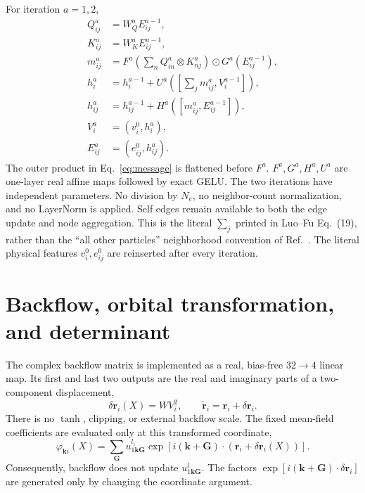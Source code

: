 For iteration $a=1,2$,
\begin{align}
 Q_{ij}^{a}&=W_Q^{a}E_{ij}^{a-1},\\
 K_{ij}^{a}&=W_K^{a}E_{ij}^{a-1},\\
 m_{ij}^{a}
 &=F^{a}\!\left(\sum_n
 Q_{in}^{a}\otimes K_{nj}^{a}\right)
 \odot G^{a}(E_{ij}^{a-1}),                             \label{eq:message}\\
 h_i^{a}
 &=h_i^{a-1}+U^{a}\!\left(
 [\sum_jm_{ij}^{a},V_i^{a-1}]\right),\\
 h_{ij}^{a}
 &=h_{ij}^{a-1}+H^{a}\!\left(
 [m_{ij}^{a},E_{ij}^{a-1}]\right),\\
 V_i^{a}&=(v_i^0,h_i^{a}),\\
 E_{ij}^{a}&=(e_{ij}^0,h_{ij}^{a}).
 \label{eq:graphupdate}
\end{align}
The outer product in Eq.~\eqref{eq:message} is flattened before $F^a$.
$F^a,G^a,H^a,U^a$ are one-layer real affine maps followed by exact GELU.
The two iterations have independent parameters. No division by $N_e$, no
neighbor-count normalization, and no LayerNorm is applied. Self edges remain
available to both the edge update and node aggregation. This is the literal
$\sum_j$ printed in Luo--Fu Eq.~(19), rather than the ``all other particles''
neighborhood convention of Ref.~\cite{pescia}. The literal physical features
$v_i^0,e_{ij}^0$ are reinserted after every iteration.

\section{Backflow, orbital transformation, and determinant}

The complex backflow matrix is implemented as a real, bias-free
$32\to4$ linear map. Its first and last two outputs are the real and
imaginary parts of a two-component displacement,
\begin{equation}
 \delta\bm r_i(X)=W V_i^2,\qquad
 \widetilde{\bm r}_i=\bm r_i+\delta\bm r_i .
 \label{eq:strictbackflow}
\end{equation}
There is no $\tanh$, clipping, or external backflow scale. The fixed
mean-field coefficients are evaluated only at this transformed coordinate,
\begin{equation}
 \varphi_{\bm k i}(X)=
 \sum_{\bm G}u^{l_i}_{1\bm k\bm G}
 \exp\!\left[i(\bm k+\bm G)\cdot
 (\bm r_i+\delta\bm r_i(X))\right].
 \label{eq:strictphi}
\end{equation}
Consequently, backflow does not update $u^l_{1\bm k\bm G}$. The factors
$\exp[i(\bm k+\bm G)\cdot\delta\bm r_i]$ are generated only by changing the
coordinate argument.

